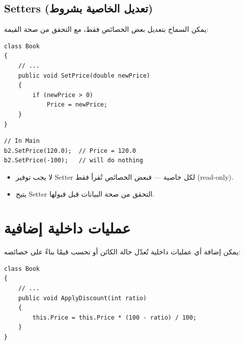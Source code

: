 \documentclass[14pt]{extarticle}
\begin{document}
\clearpage
\subsection{\textenglish{Setters} (تعديل الخاصية بشروط)}

يمكن السماح بتعديل بعض الخصائص فقط، مع التحقق من صحة القيمة:

\begin{boxExample}
\begin{english}
\begin{verbatim}
class Book
{
    // ...
    public void SetPrice(double newPrice)
    {
        if (newPrice > 0)
            Price = newPrice;
    }
}
\end{verbatim}
\end{english}
\end{boxExample}

\begin{boxExample}
\begin{english}
\begin{verbatim}
// In Main
b2.SetPrice(120.0);  // Price = 120.0
b2.SetPrice(-100);   // will do nothing
\end{verbatim}
\end{english}
\end{boxExample}

\begin{itemize}[itemsep=1pt]
    \item لا يجب توفير \textenglish{Setter} لكل خاصية — فبعض الخصائص تُقرأ فقط (\textenglish{read-only}).
    \item يتيح \textenglish{Setter} التحقق من صحة البيانات قبل قبولها.
\end{itemize}

\clearpage
\section{عمليات داخلية إضافية}

يمكن إضافة أي عمليات داخلية تُعدّل حالة الكائن أو تحسب قيمًا بناءً على خصائصه:

\begin{boxExample}
\begin{english}
\begin{verbatim}
class Book
{
    // ...
    public void ApplyDiscount(int ratio)
    {
        this.Price = this.Price * (100 - ratio) / 100;
    }
}
\end{verbatim}
\end{english}
\end{boxExample}
\end{document}
